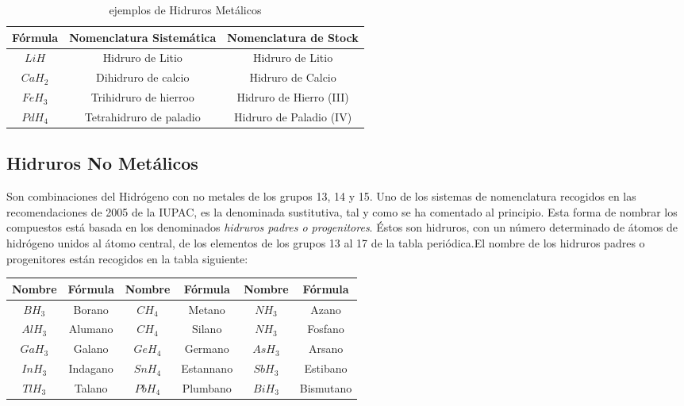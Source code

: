 \documentclass[11pt,fleqn]{book} %
\begin{document}
\begin{table}[h!]
	\centering
	\begin{tabular}{c|cc}
	Fórmula&Nomenclatura Sistemática&Nomenclatura de Stock\\ \hline
	$LiH$&Hidruro de Litio&Hidruro de Litio\\ 
	$CaH_2$&Dihidruro de calcio&Hidruro de Calcio\\
	$FeH_3$&Trihidruro de hierroo&Hidruro de Hierro (III)\\
	$PdH_4$&Tetrahidruro de paladio&Hidruro de Paladio (IV)\\ \hline
	\end{tabular}
	\caption{ejemplos de Hidruros Metálicos}
\end{table}
\subsection{Hidruros No Metálicos}
Son combinaciones del Hidrógeno con no metales de los grupos 13, 14 y 15. Uno de los sistemas de nomenclatura recogidos en las recomendaciones de 2005 de la IUPAC, es la denominada sustitutiva, tal y como se ha comentado al principio. Esta forma de nombrar los compuestos está basada en los denominados \emph{hidruros padres o progenitores}. Éstos son hidruros, con un número determinado de átomos de hidrógeno unidos al átomo central, de los elementos de los grupos 13 al 17 de la tabla periódica.El nombre de los hidruros padres o progenitores están recogidos en la tabla siguiente:
\begin{table}[h!]
	\centering
	\begin{tabular}{|c|c||c|c||c|c|}\hline
		Nombre&Fórmula&Nombre&Fórmula&Nombre&Fórmula\\ \hline
		$BH_3$&Borano&$CH_4$&Metano&$NH_3$&Azano\\
		$AlH_3$&Alumano&$CH_4$&Silano&$NH_3$&Fosfano\\
		$GaH_3$&Galano&$GeH_4$&Germano&$AsH_3$&Arsano\\
		$InH_3$&Indagano&$SnH_4$&Estannano&$SbH_3$&Estibano\\
		$TlH_3$&Talano&$PbH_4$&Plumbano&$BiH_3$&Bismutano\\ \hline
		
	\end{tabular}
\end{table}
\end{document}
